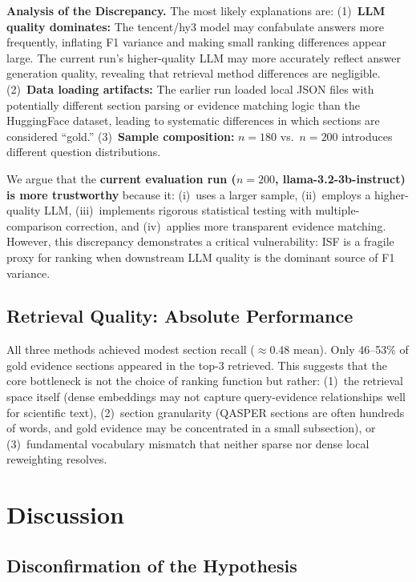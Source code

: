 \documentclass[11pt,letterpaper]{article}
\begin{document}
\textbf{Analysis of the Discrepancy.} The most likely explanations are:
(1)~\textbf{LLM quality dominates:} The tencent/hy3 model may confabulate answers
more frequently, inflating F1 variance and making small ranking differences appear
large. The current run's higher-quality LLM may more accurately reflect answer
generation quality, revealing that retrieval method differences are negligible.
(2)~\textbf{Data loading artifacts:} The earlier run loaded local JSON files with
potentially different section parsing or evidence matching logic than the
HuggingFace dataset, leading to systematic differences in which sections are
considered ``gold.''
(3)~\textbf{Sample composition:} $n{=}180$ vs.\ $n{=}200$ introduces different
question distributions.

We argue that the \textbf{current evaluation run ($n{=}200$, llama-3.2-3b-instruct)
is more trustworthy} because it: (i)~uses a larger sample, (ii)~employs a
higher-quality LLM, (iii)~implements rigorous statistical testing with
multiple-comparison correction, and (iv)~applies more transparent evidence
matching. However, this discrepancy demonstrates a critical vulnerability: ISF is
a fragile proxy for ranking when downstream LLM quality is the dominant source of
F1 variance.

\subsection{Retrieval Quality: Absolute Performance}

All three methods achieved modest section recall ($\approx$0.48 mean). Only 46–53\%
of gold evidence sections appeared in the top-3 retrieved. This suggests that the
core bottleneck is not the choice of ranking function but rather: (1)~the
retrieval space itself (dense embeddings may not capture query-evidence
relationships well for scientific text), (2)~section granularity (QASPER sections
are often hundreds of words, and gold evidence may be concentrated in a small
subsection), or (3)~fundamental vocabulary mismatch that neither sparse nor dense
local reweighting resolves.

\section{Discussion}

\subsection{Disconfirmation of the Hypothesis}
\end{document}
